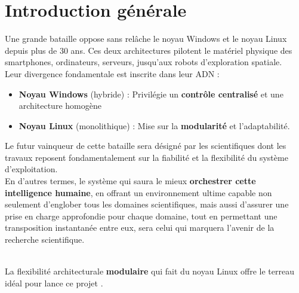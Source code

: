 
\chapter*{Introduction générale} 
\adjustmtc

\label{chap:introduction}



Une grande bataille oppose sans relâche le noyau Windows et le noyau Linux depuis plus de 30 ans.  
Ces deux architectures pilotent le matériel physique des smartphones, ordinateurs, serveurs, jusqu’aux robots d’exploration spatiale.\\

Leur divergence fondamentale est inscrite dans leur ADN :  
\begin{itemize}  
  \item \textbf{Noyau Windows} (hybride) : Privilégie un \textbf{contrôle centralisé} et une architecture homogène  
  \item \textbf{Noyau Linux} (monolithique) : Mise sur la \textbf{modularité} et l’adaptabilité.\\
\end{itemize}  

Le futur vainqueur de cette bataille sera désigné par les scientifiques dont les travaux reposent fondamentalement sur la fiabilité et la flexibilité du système d’exploitation.\\  
En d'autres termes, le système qui saura le mieux \textbf{orchestrer cette intelligence humaine}, en offrant un environnement ultime capable non seulement d’englober tous les domaines scientifiques, mais aussi d’assurer une prise en charge approfondie pour chaque domaine, tout en permettant une transposition instantanée entre eux, sera celui qui marquera l’avenir de la recherche scientifique.\\ \\


\medskip

 La  flexibilité architecturale  \textbf{modulaire} qui fait du noyau Linux  offre le terreau idéal pour lance ce projet  .  

